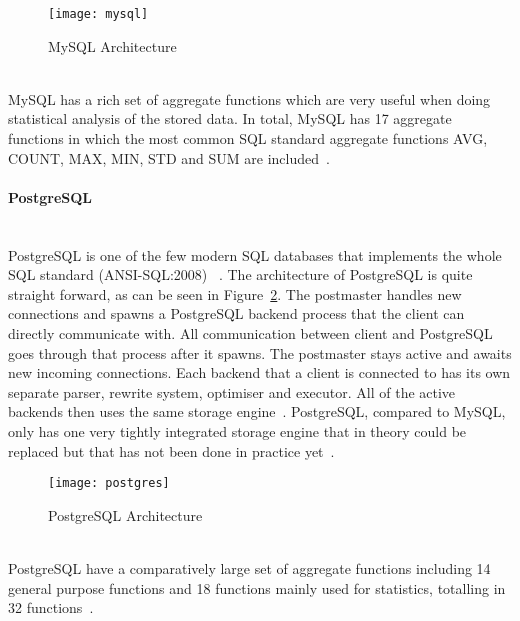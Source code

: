\documentclass[a4paper,12pt]{article}
\begin{document}
\begin{figure}[h!]
    \vspace{0.25in}
    \centerline{\texttt{[image: mysql]}}
    \caption{MySQL Architecture~\cite{HIMYSQL}}
    \label{fig:mysql}
\end{figure}
~\\

MySQL has a rich set of aggregate functions which are very useful when doing statistical analysis of the stored data. In total, MySQL has 17 aggregate functions in which the most common SQL standard 
aggregate functions AVG, COUNT, MAX, MIN, STD and SUM are included~\cite{MYSQLAGG}.

\FloatBarrier
\newpage
\paragraph{PostgreSQL}
~\\
PostgreSQL is one of the few modern SQL databases that implements the whole SQL standard (ANSI-SQL:2008) ~\cite{POSTGRESSTANDARD}. 
The architecture of PostgreSQL is quite straight forward, as can be seen in Figure~\ref{fig:postgres}. The postmaster handles new connections and spawns a PostgreSQL backend process that the client can directly communicate with. All communication 
between client and PostgreSQL goes through that process after it spawns. The postmaster stays active and awaits new incoming connections. Each backend that a client is connected to has its own separate 
parser, rewrite system, optimiser and executor. All of the active backends then uses the same storage engine~\cite{POSTGRES}. PostgreSQL, compared to MySQL, only has one very tightly integrated 
storage engine that in theory could be replaced but that has not been done in practice yet~\cite{POSTGRESQLPAPER}.

\begin{figure}[h!]
    \vspace{0.25in}
    \centerline{\texttt{[image: postgres]}}
    \caption{PostgreSQL Architecture~\cite{POSTGRES}}
    \label{fig:postgres}
\end{figure}
~\\

PostgreSQL have a comparatively large set of aggregate functions including 14 general purpose functions and 18 functions mainly used for statistics, totalling in 32 functions~\cite{POSTGRESAGG}.

\end{document}
